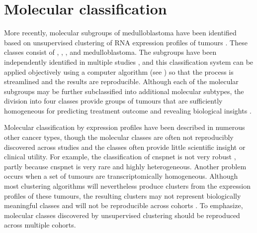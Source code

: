 

\section{Molecular classification}

More recently, molecular subgroups of medulloblastoma have been identified based on unsupervised clustering of RNA expression profiles of tumours . These classes consist of , , , and  medulloblastoma. The subgroups have been independently identified in multiple studies , and this classification system can be applied objectively using a computer algorithm (see ) so that the process is streamlined and the results are reproducible. Although each of the molecular subgroups may be further subclassified into additional molecular subtypes, the division into four classes provide groups of tumours that are sufficiently homogeneous for predicting treatment outcome and revealing biological insights .

Molecular classification by expression profiles have been described in numerous other cancer types, though the molecular classes are often not reproducibly discovered across studies and the classes often provide little scientific insight or clinical utility. For example, the classification of \gls{cnspnet} is not very robust , partly because \gls{cnspnet} is very rare and highly heterogeneous. Another problem occurs when a set of tumours are transcriptomically homogeneous. Although most clustering algorithms will nevertheless produce clusters from the expression profiles of these tumours, the resulting clusters may not represent biologically meaningful classes and will not be reproducible across cohorts . To emphasize, molecular classes discovered by unsupervised clustering should be reproduced across multiple cohorts.

